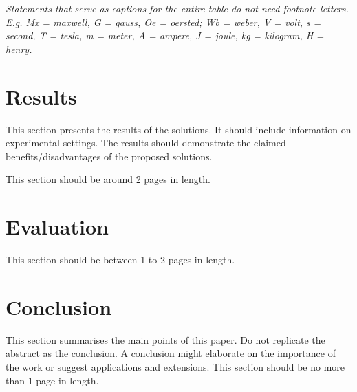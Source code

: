 \documentclass[10pt,journal,compsoc]{IEEEtran}
\begin{document}
%

\noindent \textit{Statements that serve as captions for the entire table do not need footnote letters.  E.g. Mx = maxwell, G = gauss, Oe = oersted; Wb = weber, V = volt, s = second, T = tesla, m = meter, A = ampere, J = joule, kg = kilogram, H = henry.}

\section{Results}
This section presents the results of the solutions. It should include information on experimental settings. The results should demonstrate the claimed benefits/disadvantages of the proposed solutions.

This section should be around 2 pages in length.

\section{Evaluation}
This section should be between 1 to 2 pages in length.

\section{Conclusion}
This section summarises the main points of this paper. Do not replicate the abstract as the conclusion. A conclusion might elaborate on the importance of the work or suggest applications and extensions. This section should be no more than 1 page in length.
\end{document}
